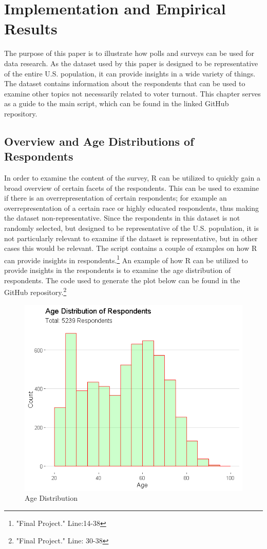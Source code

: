 \documentclass{article}
\begin{document}
\section{Implementation and Empirical Results}
The purpose of this paper is to illustrate how polls and surveys can be used for data research.  As the dataset used by this paper is designed to be representative of the entire U.S. population, it can provide insights in a wide variety of things. The dataset contains information about the respondents that can be used to examine other topics not necessarily related to voter turnout. This chapter serves as a guide to the main script, which can be found in the linked GitHub repository. 

\subsection{Overview and Age Distributions of Respondents}
In order to examine the content of the survey, R can be utilized to quickly gain a broad overview of certain facets of the respondents. This can be used to examine if there is an overrepresentation of certain respondents; for example an overrepresentation of a certain race or highly educated respondents, thus making the dataset non-representative. Since the respondents in this dataset is not randomly selected, but designed to be representative of the U.S. population, it is not particularly relevant to examine if the dataset is representative, but in other cases this would be relevant. The script contains a couple of examples on how R can provide insights in respondents.\footnote{"Final Project." Line:14-38}  An example of how R can be utilized to provide insights in the respondents is to examine the age distribution of respondents. The code used to generate the plot below can be found in the GitHub repository.\footnote{"Final Project." Line: 30-38}      
\begin{figure}[!ht]
  \centering
  \includegraphics[width=\textwidth]{age_distribution.png}
  \caption{Age Distribution}
\end{figure}
\pagebreak
\end{document}
